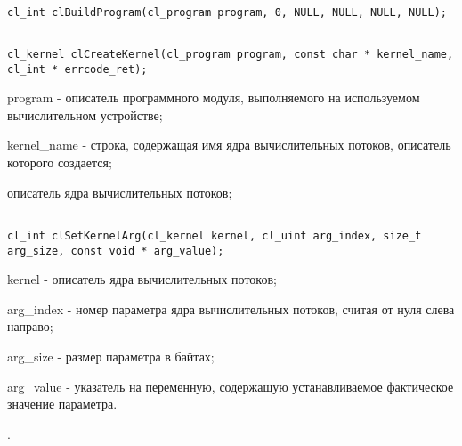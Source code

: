 \begin{enumerate}


\begin{lstlisting}

cl_int clBuildProgram(cl_program program, 0, NULL, NULL, NULL, NULL);

\end{lstlisting}




\begin{lstlisting}

cl_kernel clCreateKernel(cl_program program, const char * kernel_name, cl_int * errcode_ret);

\end{lstlisting}

		\openclend
		{
			\item program - описатель программного модуля, выполняемого на используемом вычислительном устройстве;
			\item kernel\_name - строка, содержащая имя ядра вычислительных потоков, описатель которого создается;
			\errcode
		}
		{описатель ядра вычислительных потоков;}



\begin{lstlisting}

cl_int clSetKernelArg(cl_kernel kernel, cl_uint arg_index, size_t arg_size, const void * arg_value);

\end{lstlisting}

		\openclend
		{
			\item kernel - описатель ядра вычислительных потоков;
			\item arg\_index - номер параметра ядра вычислительных потоков, считая от нуля слева направо;
			\item arg\_size - размер параметра в байтах;
			\item arg\_value - указатель на переменную, содержащую устанавливаемое фактическое значение параметра.
		}
		{\openclsuccess.}


\end{enumerate}
